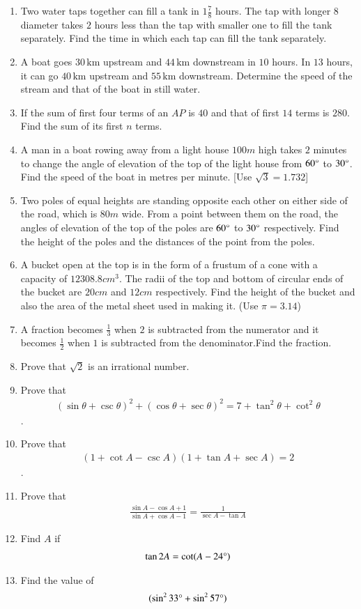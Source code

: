 \documentclass[12pt,-letter paper]{article}
\providecommand{\brak}[1]{\ensuremath{\left(#1\right)}}\graphicspath{{/storage/self/primary/Download/latexnew/fig}}
\begin{document}
\begin{enumerate}
\item Two water taps together can fill a tank in $1\frac{7}{8}$ hours. The tap with longer $8$ diameter takes $2$ hours less than the tap with smaller one to fill the tank separately. Find the time in which each tap can fill the tank separately.
\item A boat goes $30 \,\text{km}$ upstream and $44 \,\text{km}$ downstream in $10$ hours. In $13$ hours, it can go $40\,\text{km}$ upstream and $55 \,\text{km}$ downstream. Determine the speed of the stream and that of the boat in still water.
\item If the sum of first four terms of an $AP$ is $40$ and that of first $14$ terms is $280$. Find the sum of its first $n$ terms.
\item A man in a boat rowing away from a light house $100m$  high takes $2$ minutes to change the angle of elevation of the top of the light house from $60\degree$ to $30\degree$. Find the speed of the boat in metres per minute. [Use $\sqrt{3}=1.732$]
\item Two poles of equal heights are standing opposite each other on either side of the road, which is $80 m$  wide. From a point between them on the road, the angles of elevation of the top of the poles are $60\degree$ to $30\degree$ respectively. Find the height of the poles and the distances of the point from the poles.
\item A bucket open at the top is in the form of a frustum of a cone with a capacity of $12308.8 cm^3$. The radii of the top and bottom of circular ends of the bucket are $20 cm$ and $12cm$ respectively. Find the height of the bucket and also the area of the metal sheet used in making it. (Use  $\pi= 3.14$)
\item A fraction becomes $\frac{1}{3}$ when $2$ is subtracted from the numerator and it becomes $\frac{1}{2}$ when $1$ is subtracted from the denominator.Find the fraction.
\item Prove that $\sqrt{2}$ is an irrational number.
\item Prove that \begin{align*} \brak{\sin\theta + \csc\theta}^2 + \brak{\cos\theta + \sec\theta}^2 = 7 + \tan^2\theta + \cot^2\theta\end{align*}.
\item Prove that \begin{align*}\brak{1+\cot A - \csc A} \brak{1 + \tan A +\sec A} = 2 \end{align*}.
\item Prove that \begin{align*} \frac{\sin A-\cos A+1}{\sin A+ \cos A-1} =\frac{1}{\sec A-\tan A}\end{align*}
\item Find $A$ if \begin{align*}\tan 2A = \cot (A-24\degree)\end{align*}
\item Find the value of \begin{align*}(\sin^2 33\degree+ \sin^2 57\degree)\end{align*}
\end{enumerate}
\end{document}
